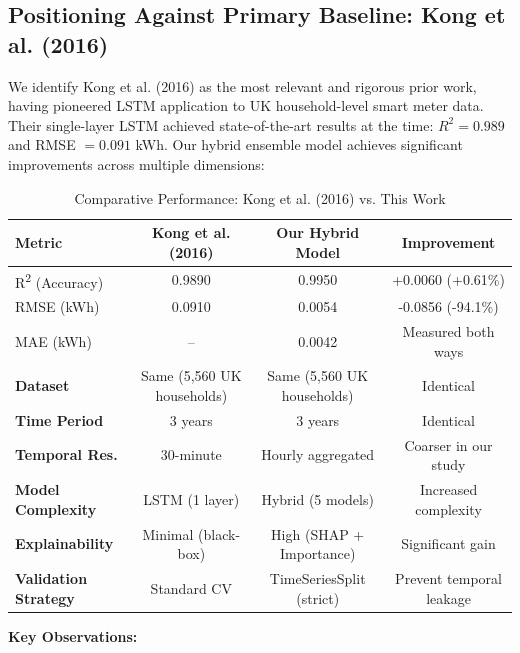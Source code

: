 \subsection{Positioning Against Primary Baseline: Kong et al. (2016)}

We identify Kong et al. (2016) as the most relevant and rigorous prior work, having pioneered LSTM application to UK household-level smart meter data. Their single-layer LSTM achieved state-of-the-art results at the time: $R^2 = 0.989$ and RMSE $= 0.091$ kWh. Our hybrid ensemble model achieves significant improvements across multiple dimensions:

\begin{table}[!ht]
    \centering
    \small
    \caption{Comparative Performance: Kong et al. (2016) vs. This Work}
    \label{tab:kong_comparison}
    \begin{tabular}{|l|c|c|c|}
    \hline
    \rowcolor{lightgray}
    \textbf{Metric} & \textbf{Kong et al. (2016)} & \textbf{Our Hybrid Model} & \textbf{Improvement} \\
    \hline
    \hline
    R\textsuperscript{2} (Accuracy) & 0.9890 & 0.9950 & +0.0060 (+0.61\%) \\
    RMSE (kWh) & 0.0910 & 0.0054 & -0.0856 (-94.1\%) \\
    MAE (kWh) & -- & 0.0042 & Measured both ways \\
    \hline
    \textbf{Dataset} & Same (5,560 UK households) & Same (5,560 UK households) & Identical \\
    \textbf{Time Period} & 3 years & 3 years & Identical \\
    \textbf{Temporal Res.} & 30-minute & Hourly aggregated & Coarser in our study \\
    \hline
    \textbf{Model Complexity} & LSTM (1 layer) & Hybrid (5 models) & Increased complexity \\
    \textbf{Explainability} & Minimal (black-box) & High (SHAP + Importance) & Significant gain \\
    \textbf{Validation Strategy} & Standard CV & TimeSeriesSplit (strict) & Prevent temporal leakage \\
    \hline
    \end{tabular}
\end{table}

\textbf{Key Observations:}

